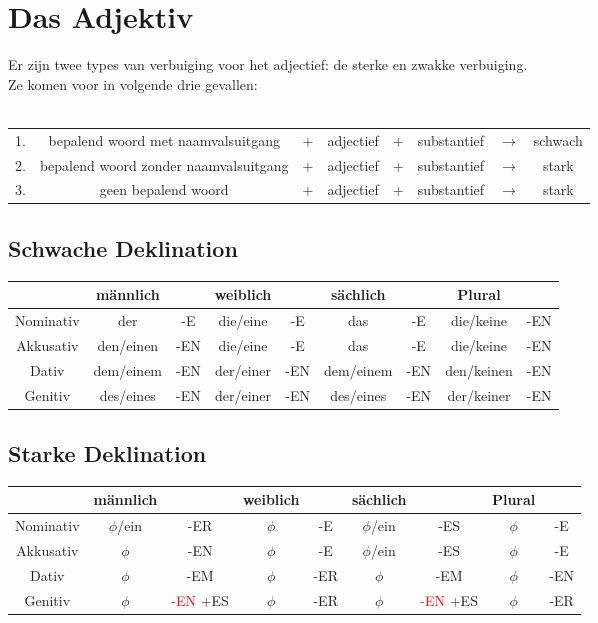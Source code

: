 \documentclass[main.tex]{subfiles}
\begin{document}
\chapter{Das Adjektiv}
Er zijn twee types van verbuiging voor het adjectief: de sterke en zwakke verbuiging.\\
Ze komen voor in volgende drie gevallen:
\\
\\
\bgroup
\def\arraystretch{1.5}
\begin{tabular}{cccccccc}
1. & bepalend woord met naamvalsuitgang & + & adjectief & + & substantief & $\rightarrow$ & schwach \\ 

2. & bepalend woord zonder naamvalsuitgang & + & adjectief & + & substantief & $\rightarrow$ & stark \\

3. & geen bepalend woord & + & adjectief & + & substantief & $\rightarrow$ & stark \\ 
\end{tabular} 
\egroup

\section{Schwache Deklination}
\begin{tabular}{|c|c|c|c|c|c|c|c|c|}
\hline 
\rowcolor{gray}
  & männlich &  & weiblich &  & sächlich &  & Plural &  \\ 
\hline 
\cellcolor[gray]{0.8}Nominativ & der & -E & die/eine & -E & das & -E & die/keine & -EN \\ 
\hline 
\cellcolor[gray]{0.8}Akkusativ & den/einen & -EN & die/eine & -E & das & -E & die/keine & -EN \\ 
\hline 
\cellcolor[gray]{0.8}Dativ & dem/einem & -EN & der/einer & -EN & dem/einem & -EN & den/keinen & -EN \\ 
\hline 
\cellcolor[gray]{0.8}Genitiv & des/eines & -EN & der/einer & -EN & des/eines & -EN & der/keiner & -EN \\ 
\hline 
\end{tabular} 
\section{Starke Deklination}
\begin{tabular}{|c|c|c|c|c|c|c|c|c|}
\hline 
\rowcolor{gray}
  & männlich &  & weiblich &  & sächlich &  & Plural &  \\ 
\hline 
\cellcolor[gray]{0.8}Nominativ & $\phi$/ein & -ER & $\phi$ & -E & $\phi$/ein & -ES & $\phi$ & -E \\ 
\hline 
\cellcolor[gray]{0.8}Akkusativ & $\phi$ & -EN & $\phi$ & -E & $\phi$/ein & -ES & $\phi$ & -E \\ 
\hline 
\cellcolor[gray]{0.8}Dativ & $\phi$ & -EM & $\phi$ & -ER & $\phi$ & -EM & $\phi$ & -EN \\ 
\hline 
\cellcolor[gray]{0.8}Genitiv & $\phi$ & \textcolor{red}{-EN} +ES & $\phi$ & -ER & $\phi$ & \textcolor{red}{-EN} +ES & $\phi$ & -ER \\ 
\hline 
\end{tabular} 
\end{document}
